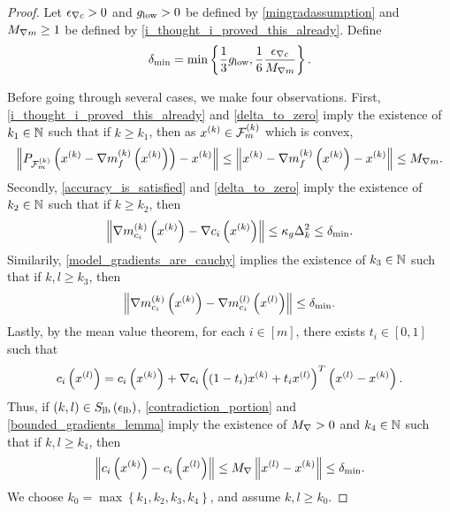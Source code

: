 \begin{proof}

Let ${\epsilon_{\nabla c}} > 0$ and ${ g_{\textrm{low}} } > 0$ be defined by \cref{mingradassumption}
and ${M_{\nabla m}} \ge 1$ be defined by \cref{i_thought_i_proved_this_already}.
Define
\begin{align*}
{\delta_{\textrm{min}}} = \min\left\{\frac 1 3 { g_{\textrm{low}} }, \frac 1 {6} \frac{{\epsilon_{\nabla c}}}{{M_{\nabla m}}} \right\}.
\end{align*}

Before going through several cases, we make four observations.
First, \cref{i_thought_i_proved_this_already} and \cref{delta_to_zero} imply the existence of $k_1 \in \mathbb N$
such that if $k \ge k_1$, then as $x^{(k)} \in {\mathcal F_m^{(k)}}$ which is convex,
\begin{align*}
\left\|P_{{\mathcal F_m^{(k)}}}\left(x^{(k)} - {\nabla m_f^{(k)}\left(x^{(k)}\right)}\right) - x^{(k)}\right\| 
\le \left\|x^{(k)} - {\nabla m_f^{(k)}\left(x^{(k)}\right)} - x^{(k)} \right\| \le {M_{\nabla m}}.
\end{align*}
Secondly, \cref{accuracy_is_satisfied} and \cref{delta_to_zero} imply the existence of $k_2 \in \mathbb N$ such that if $k \ge k_2$, then
\begin{align}
\left\|{\nabla m_{c_i}^{(k)}\left(x^{(k)}\right)} - \nabla c_i\left(x^{(k)}\right)\right\| \le \kappa_g \Delta_k^2 \le {\delta_{\textrm{min}}}. \label{hmoydihtp_eqn1}
\end{align}
Similarily, \cref{model_gradients_are_cauchy} implies the existence of $k_3 \in \mathbb N$ such that if $k, l \ge k_3$, then 
\begin{align}
\left\|{\nabla m_{c_i}^{(k)}\left(x^{(k)}\right)} - {\nabla m_{c_i}^{(l)}\left({x^{(l)}}\right)}\right\| \le {\delta_{\textrm{min}}}. \label{hmoydihtp_eqn2}
\end{align}
Lastly, by the mean value theorem, for each $i \in [m]$, there exists $t_i \in [0, 1]$ such that
\begin{align*}
c_i\left({x^{(l)}}\right) = c_i\left(x^{(k)}\right) + \nabla c_i\left((1 - t_i)x^{(k)} + t_i {x^{(l)}}\right)^T\left({x^{(l)}} - x^{(k)}\right).
\end{align*}
Thus, if $(k, l) \in {S_{\textrm{lb}}\left(\epsilon_{\textrm{lb}}\right)}$, \cref{contradiction_portion} and \cref{bounded_gradients_lemma}
imply the existence of ${M_{\nabla}} > 0$ and $k_4 \in \mathbb N$ such that if $k, l \ge k_4$, 
then
\begin{align}
\left\|c_i\left(x^{(k)}\right) - c_i\left({x^{(l)}}\right) \right\| \le {M_{\nabla}} \left\|{x^{(l)}} - x^{(k)}\right\| \le {\delta_{\textrm{min}}}. \label{hmoydihtp_eqn3}
\end{align}
We choose $k_0 = \max\left\{k_1, k_2, k_3, k_4\right\}$, and assume $k, l \ge k_0$.


\end{proof}
